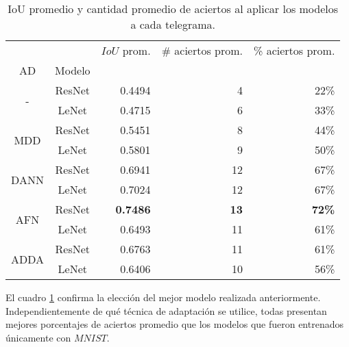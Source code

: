 \begin{table}[H]
    \centering
    \begin{tabular}{cc|rrr}
        \toprule
                                 &        & $IoU$ prom.     & \# aciertos prom. & \% aciertos prom. \\
        AD                       & Modelo &                 &                   &                   \\
        \midrule
        \multirow[c]{2}{*}{-}    & ResNet & 0.4494          & 4                 & 22\%              \\
                                 & LeNet  & 0.4715          & 6                 & 33\%              \\\hline
        \multirow[c]{2}{*}{MDD}  & ResNet & 0.5451          & 8                 & 44\%              \\
                                 & LeNet  & 0.5801          & 9                 & 50\%              \\\hline
        \multirow[c]{2}{*}{DANN} & ResNet & 0.6941          & 12                & 67\%              \\
                                 & LeNet  & 0.7024          & 12                & 67\%              \\\hline
        \multirow[c]{2}{*}{AFN}  & ResNet & \textbf{0.7486} & \textbf{13}       & \textbf{72\%}     \\
                                 & LeNet  & 0.6493          & 11                & 61\%              \\\hline
        \multirow[c]{2}{*}{ADDA} & ResNet & 0.6763          & 11                & 61\%              \\
                                 & LeNet  & 0.6406          & 10                & 56\%              \\
        \bottomrule
    \end{tabular}
    \caption{IoU promedio y cantidad promedio de aciertos al aplicar los modelos a cada telegrama.}
    \label{tab:iou-cant-aciertos-en-telegramas}
\end{table}

El cuadro \ref{tab:iou-cant-aciertos-en-telegramas} confirma la elecci\'on del mejor modelo realizada anteriormente.
Independientemente de qu\'e t\'ecnica de adaptaci\'on se utilice, todas presentan mejores porcentajes de aciertos
promedio que los modelos que fueron entrenados \'unicamente con $MNIST$.

